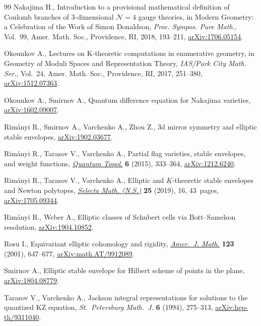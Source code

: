 \begin{thebibliography}{99}
Nakajima H., Introduction to a provisional mathematical definition of {C}oulomb
 branches of 3-dimensional {${\mathcal N}=4$} gauge theories, in Modern
 Geometry: a Celebration of the Work of {S}imon {D}onaldson, \textit{Proc.
 Sympos. Pure Math.}, Vol.~99, Amer. Math. Soc., Providence, RI, 2018,
 193--211, \href{https://arxiv.org/abs/1706.05154}{arXiv:1706.05154}.

Okounkov A., Lectures on {K}-theoretic computations in enumerative geometry, in
 Geometry of Moduli Spaces and Representation Theory, \textit{IAS/Park City
 Math. Ser.}, Vol.~24, Amer. Math. Soc., Providence, RI, 2017, 251--380,
 \href{https://arxiv.org/abs/1512.07363}{arXiv:1512.07363}.

Okounkov A., Smirnov A., Quantum difference equation for Nakajima varieties,
 \href{https://arxiv.org/abs/1602.09007}{arXiv:1602.09007}.

Rim\'anyi R., Smirnov A., Varchenko A., Zhou Z., 3d mirror symmetry and
 elliptic stable envelopes, \href{https://arxiv.org/abs/1902.03677}{arXiv:1902.03677}.

Rim\'anyi R., Tarasov V., Varchenko A., Partial flag varieties, stable
 envelopes, and weight functions, \href{https://doi.org/10.4171/QT/65}{\textit{Quantum Topol.}} \textbf{6} (2015),
 333--364, \href{https://arxiv.org/abs/1212.6240}{arXiv:1212.6240}.

Rim\'anyi R., Tarasov V., Varchenko A., Elliptic and {$K$}-theoretic stable
 envelopes and {N}ewton polytopes, \href{https://doi.org/10.1007/s00029-019-0451-5}{\textit{Selecta Math. (N.S.)}} \textbf{25}
 (2019), 16, 43~pages, \href{https://arxiv.org/abs/1705.09344}{arXiv:1705.09344}.

Rim\'anyi R., Weber A., Elliptic classes of {S}chubert cells via
 {B}ott--{S}amelson resolution, \href{https://arxiv.org/abs/1904.10852}{arXiv:1904.10852}.

Rosu I., Equivariant elliptic cohomology and rigidity, \href{https://doi.org/10.1353/ajm.2001.0027}{\textit{Amer.~J. Math.}}
 \textbf{123} (2001), 647--677, \href{https://arxiv.org/abs/math.AT/9912089}{arXiv:math.AT/9912089}.

Smirnov A., Elliptic stable envelope for Hilbert scheme of points in the plane,
 \href{https://arxiv.org/abs/1804.08779}{arXiv:1804.08779}.

Tarasov V., Varchenko A., Jackson integral representations for solutions to the
 quantized KZ equation, \textit{St.~Petersburg Math.~J.} \textbf{6} (1994),
 275--313, \href{https://arxiv.org/abs/hep-th/9311040}{arXiv:hep-th/9311040}.


\end{thebibliography}
